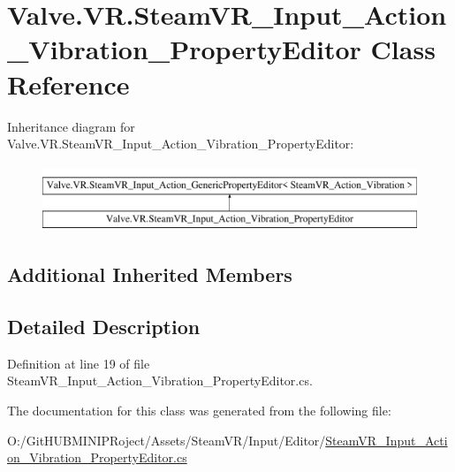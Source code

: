 \hypertarget{class_valve_1_1_v_r_1_1_steam_v_r___input___action___vibration___property_editor}{}\section{Valve.\+V\+R.\+Steam\+V\+R\+\_\+\+Input\+\_\+\+Action\+\_\+\+Vibration\+\_\+\+Property\+Editor Class Reference}
\label{class_valve_1_1_v_r_1_1_steam_v_r___input___action___vibration___property_editor}
Inheritance diagram for Valve.\+V\+R.\+Steam\+V\+R\+\_\+\+Input\+\_\+\+Action\+\_\+\+Vibration\+\_\+\+Property\+Editor\+:\begin{figure}[H]
\begin{center}
\leavevmode
\includegraphics[height=2.000000cm]{class_valve_1_1_v_r_1_1_steam_v_r___input___action___vibration___property_editor}
\end{center}
\end{figure}
\subsection*{Additional Inherited Members}


\subsection{Detailed Description}


Definition at line 19 of file Steam\+V\+R\+\_\+\+Input\+\_\+\+Action\+\_\+\+Vibration\+\_\+\+Property\+Editor.\+cs.



The documentation for this class was generated from the following file\+:\begin{DoxyCompactItemize}
\item 
O\+:/\+Git\+H\+U\+B\+M\+I\+N\+I\+P\+Roject/\+Assets/\+Steam\+V\+R/\+Input/\+Editor/\mbox{\hyperlink{_steam_v_r___input___action___vibration___property_editor_8cs}{Steam\+V\+R\+\_\+\+Input\+\_\+\+Action\+\_\+\+Vibration\+\_\+\+Property\+Editor.\+cs}}\end{DoxyCompactItemize}
